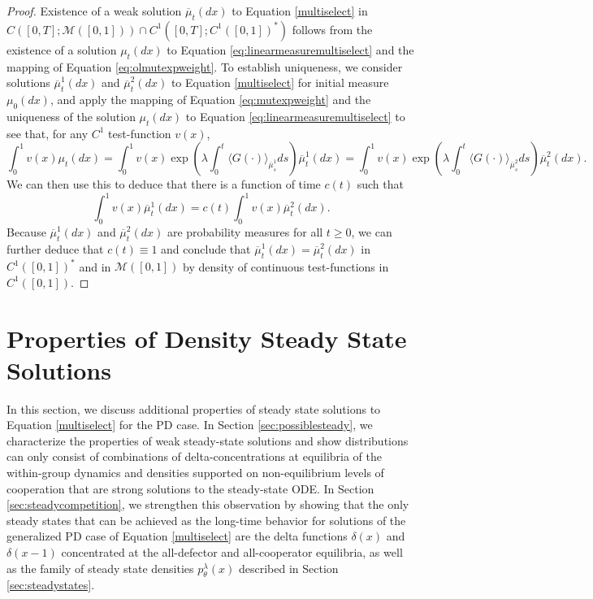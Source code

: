 \documentclass[11pt]{article}
\numberwithin{equation}{section}
\newcommand{\mc}{\mathcal}
\newcommand{\ol}{\overline}
\begin{document}
{\begin{proof}
Existence of a weak solution $\ol{\mu}_t(dx)$ to Equation \eqref{multiselect} in $ C\left(\left[0,T\right]; \mc{M}([0,1]) \right) \cap C^1\left(\left[0,T\right] ;C^1([0,1])^*  \right)$ follows from the existence of a solution $\mu_t(dx)$ to Equation \eqref{eq:linearmeasuremultiselect} and the mapping of Equation \eqref{eq:olmutexpweight}. To establish uniqueness, we consider solutions $\ol{\mu}_t^1(dx)$ and $\ol{\mu}_t^2(dx)$ to Equation \eqref{multiselect} for initial measure $\mu_0(dx)$, and apply the mapping of Equation \eqref{eq:mutexpweight} and the uniqueness of the solution $\mu_t(dx)$ to Equation \eqref{eq:linearmeasuremultiselect} to see that, for any $C^1$ test-function $v(x)$,
\begin{equation}
  \int_0^1 v(x)  \mu_t(dx) =  \int_0^1 v(x) \exp\left( \lambda \int_0^t \langle G(\cdot) \rangle_{\ol{\mu}_s^1} ds  \right) \ol{\mu}_t^1(dx) =  \int_0^1 v(x) \exp\left( \lambda \int_0^t \langle G(\cdot) \rangle_{\ol{\mu}_s^2} ds  \right) \ol{\mu}_t^2(dx).
\end{equation}
We can then use this to deduce that there is a function of time $c(t)$ such that
\begin{equation}
    \int_0^1 v(x) \ol{\mu}_t^1(dx) = c(t) \int_0^1 v(x) \ol{\mu}_t^2(dx).
\end{equation}
Because $\ol{\mu}_t^1(dx)$ and $\ol{\mu}_t^2(dx)$ are probability measures for all $t \geq 0$, we can further deduce that $c(t) \equiv 1$ and conclude that $\ol{\mu}_t^1(dx) = \ol{\mu}_t^2(dx)$ in $C^1\left(\left[0,1\right]\right)^*$ and in $\mathcal{M}\left([0,1]\right)$ by density of continuous test-functions in $C^1([0,1])$.
\end{proof}


\section{Properties of Density Steady State Solutions}
\label{sec:densitysteady}


In this section, we discuss additional properties of steady state solutions to Equation \eqref{multiselect} for the PD case. In Section \ref{sec:possiblesteady}, we characterize the properties of weak steady-state solutions and show distributions can only consist of combinations of delta-concentrations at equilibria of the within-group dynamics and densities supported on non-equilibrium levels of cooperation that are strong solutions to the steady-state ODE. In Section \ref{sec:steadycompetition}, we strengthen this observation by showing that the only steady states that can be achieved as the long-time behavior for solutions of the generalized PD case of Equation \eqref{multiselect} are the delta functions $\delta(x)$ and $\delta(x-1)$ concentrated at the all-defector and all-cooperator equilibria, as well as the family of steady state densities $p^{\lambda}_{\theta}(x)$ described in Section \ref{sec:steadystates}.

}
\end{document}
